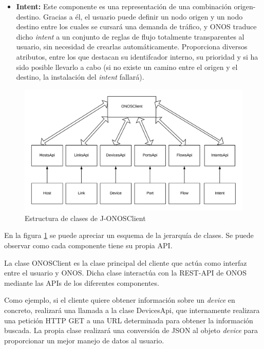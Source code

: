 \begin{itemize}
	\item \textbf{Intent:} Este componente es una representación de una combinación origen-destino. Gracias a él, el usuario puede definir un nodo origen y un nodo destino entre los cuales se cursará una demanda de tráfico, y \ac{ONOS} traduce dicho \textit{intent} a un conjunto de reglas de flujo totalmente transparentes al usuario, sin necesidad de crearlas automáticamente. Proporciona diversos atributos, entre los que destacan su identifcador interno, su prioridad y si ha sido posible llevarlo a cabo (si no existe un camino entre el origen y el destino, la instalación del \textit{intent} fallará).
	
\end{itemize}


\begin{figure}[!ht]
	\centering
	\includegraphics[width=1\linewidth]{imagenes/ONOSClient}
	\caption{Estructura de clases de J-ONOSClient}
	\label{fig:onosclient}
\end{figure}

En la figura \ref{fig:onosclient} se puede apreciar un esquema de la jerarquía de clases. Se puede observar como cada componente tiene su propia \ac{API}.

La clase ONOSClient es la clase principal del cliente que actúa como interfaz entre el usuario y \ac{ONOS}. Dicha clase interactúa con la \ac{REST}-\ac{API} de \ac{ONOS} mediante las \acp{API} de los diferentes componentes.

Como ejemplo, si el cliente quiere obtener información sobre un \textit{device} en concreto, realizará una llamada a la clase DevicesApi, que internamente realizara una petición \ac{HTTP} GET a una \ac{URL} determinada para obtener la información buscada. La propia clase realizará una conversión de \ac{JSON} al objeto \textit{device} para proporcionar un mejor manejo de datos al usuario.


